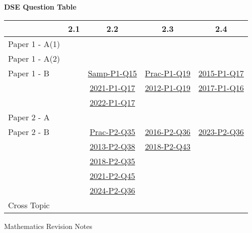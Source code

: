 \documentclass[12pt, a4paper]{article}
\begin{document}
\begin{absolutelynopagebreak}
\begin{center}
\textbf{DSE Question Table}
\end{center}
\begin{center}
\begin{tabular}{|l|c|c|c|c|}
\hline
        & 2.1 & 2.2 & 2.3 & 2.4 \\\hline
\hline
Paper 1 - A(1)&  &  &  &  \\
\hline
Paper 1 - A(2)&  &  &  &  \\
\hline
Paper 1 - B&  & \hyperref[DSE2012S-CoreP1-Q15]{Samp-P1-Q15} & \hyperref[DSE2012P-CoreP1-Q19]{Prac-P1-Q19} & \hyperref[DSE2015-CoreP1-Q17]{2015-P1-Q17} \\
&  & \hyperref[DSE2021-CoreP1-Q17]{2021-P1-Q17} & \hyperref[DSE2012-CoreP1-Q19]{2012-P1-Q19} & \hyperref[DSE2017-CoreP1-Q16]{2017-P1-Q16} \\
&  & \hyperref[DSE2022-CoreP1-Q17]{2022-P1-Q17} &  &  \\
\hline
\hline
Paper 2 - A&  &  &  &  \\
\hline
Paper 2 - B&  & \hyperref[DSE2012P-CoreP2-Q35]{Prac-P2-Q35} & \hyperref[DSE2016-CoreP2-Q36]{2016-P2-Q36} & \hyperref[DSE2023-CoreP2-Q36]{2023-P2-Q36} \\
&  & \hyperref[DSE2013-CoreP2-Q38]{2013-P2-Q38} & \hyperref[DSE2018-CoreP2-Q43]{2018-P2-Q43} &  \\
&  & \hyperref[DSE2018-CoreP2-Q35]{2018-P2-Q35} &  &  \\
&  & \hyperref[DSE2021-CoreP2-Q45]{2021-P2-Q45} &  &  \\
&  & \hyperref[DSE2024-CoreP2-Q36]{2024-P2-Q36} &  &  \\
\hline
\hline
Cross Topic&  &  &  &  \\
\hline
\end{tabular}
\end{center}
\end{absolutelynopagebreak}
\newpage
\newpage
\thispagestyle{empty}
\begin{center}
Mathematics Revision Notes\\\vspace{1cm}
\\\vspace{1cm}
{\fontsize{24pt}{24pt}\selectfont {More about Graphs of Functions}} \\\vspace{1cm}
\label{chapter:S6-3}

\end{center}
\vspace{0.5cm}
\hline
\end{document}
